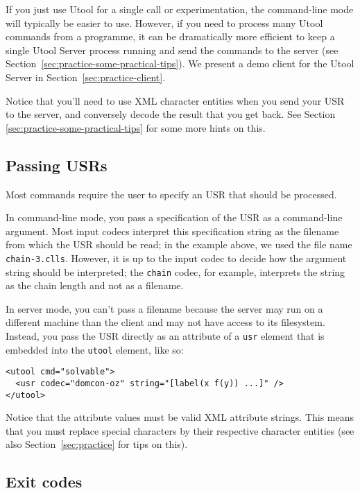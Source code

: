 If you just use Utool for a single call or experimentation, the
command-line mode will typically be easier to use. However, if you
need to process many Utool commands from a programme, it can be
dramatically more efficient to keep a single Utool Server process
running and send the commands to the server (see
Section~\ref{sec:practice-some-practical-tips}). We present a demo
client for the Utool Server in Section~\ref{sec:practice-client}.

Notice that you'll need to use XML character entities when you send your USR to the server, and conversely decode the result that you get back. See Section \ref{sec:practice-some-practical-tips} for some more hints on this.



\subsection{Passing USRs}

Most commands require the user to specify an USR that should be
processed.

In command-line mode, you pass a specification of the USR as a
command-line argument. Most input codecs interpret this specification
string as the filename from which the USR should be read; in the
example above, we used the file name \verb?chain-3.clls?. However, it
is up to the input codec to decide how the argument string should be
interpreted; the \verb?chain? codec, for example, interprets the
string as the chain length and not as a filename.

In server mode, you can't pass a filename because the server may run
on a different machine than the client and may not have access to its
filesystem. Instead, you pass the USR directly as an attribute of a
\verb?usr? element that is embedded into the \verb?utool? element,
like so:

\begin{verbatim}
<utool cmd="solvable">
  <usr codec="domcon-oz" string="[label(x f(y)) ...]" />
</utool>
\end{verbatim}

Notice that the attribute values must be valid XML attribute
strings. This means that you must replace special characters by
their respective character entities (see also
Section~\ref{sec:practice} for tips on this).


\subsection{Exit codes} \label{sec:operations-exitcodes}

